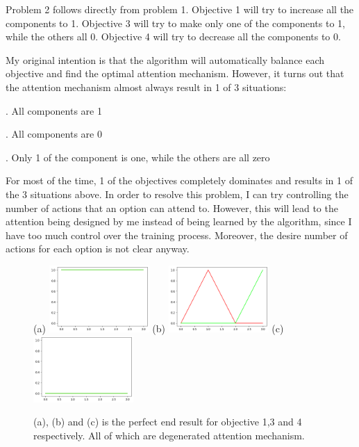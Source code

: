 \documentclass{article}
\begin{document}
	\quad Problem 2 follows directly from problem 1. Objective 1 will try to increase all the components to 1. Objective 3 will try to make only one of the components to 1, while the others all 0. Objective 4 will try to decrease all the components to 0.
	
	\quad My original intention is that the algorithm will automatically balance each objective and find the optimal attention mechanism. However, it turns out that the attention mechanism almost always result in 1 of 3 situations:
	
	. All components are 1
	
	. All components are 0
	
	. Only 1 of the component is one, while the others are all zero
	
	\quad For most of the time, 1 of the objectives completely dominates and results in 1 of the 3 situations above. In order to resolve this problem, I can try controlling the number of actions that an option can attend to. However, this will lead to the attention being designed by me instead of being learned by the algorithm, since I have too much control over the training process. Moreover, the desire number of actions for each option is not clear anyway. 
	\begin{figure}[h]
		\centering
		\small{(a)}
		\includegraphics[width=1.5in]{all1s.png}
		\hspace{0.2in}
		\small{(b)}
		\includegraphics[width=1.5in]{entropyMin.png}
		\hspace{0.2in}
		\small{(c)}
		\includegraphics[width=1.5in]{all0s.png}
		\caption{(a), (b) and (c) is the perfect end result for objective 1,3 and 4 respectively. All of which are degenerated attention mechanism.}
	\end{figure}
\end{document}
